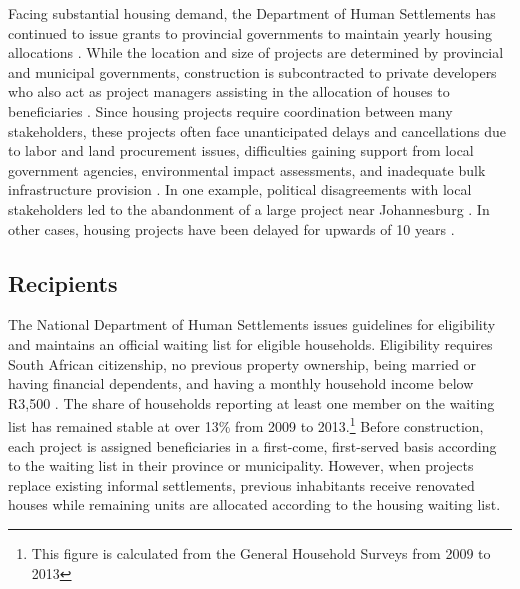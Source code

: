 \documentclass[12pt]{article}
\begin{document}
Facing substantial housing demand, the Department of Human Settlements has continued to issue grants to provincial governments to maintain yearly housing allocations \citep{dhsreports}.  While the location and size of projects are determined by provincial and municipal governments, construction is subcontracted to private developers who also act as project managers assisting in the allocation of houses to beneficiaries \citep{seriq}. Since housing projects require coordination between many stakeholders, these pro\-jects often face unanticipated delays and cancellations due to labor and land procurement issues, difficulties gaining support from local government agencies, environmental impact assessments, and inadequate bulk infrastructure provision \citep{dhsreports}.  In one example, political disagreements with local stakeholders led to the abandonment of a large project near Johannesburg \citep{protest}.  In other cases, housing projects have been delayed for upwards of 10 years \citep{dagpl}. 


\subsection{Recipients}

The National Department of Human Settlements issues guidelines for eligibility and maintains an official waiting list for eligible households.  Eligibility requires South African citizenship, no previous property ownership, being married or having financial dependents, and having a monthly household income below R3,500 \citep{seriq}. The share of households reporting at least one member on the waiting list has remained stable at over 13\% from 2009 to 2013.\footnote{\label{GHSnote}This figure is calculated from the General Household Surveys from 2009 to 2013}  Before construction, each project is assigned beneficiaries in a first-come, first-served basis according to the waiting list in their province or municipality. However, when projects replace existing informal settlements, previous inhabitants receive renovated houses while remaining units are allocated according to the housing waiting list. %
\end{document}
